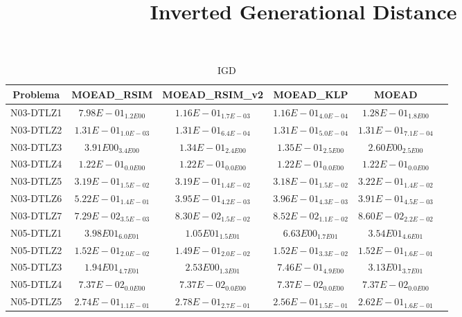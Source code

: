 \documentclass{article}
\title{Inverted Generational Distance}
\author{}
\begin{document}
\maketitle
\begin{table*}[ht!]
\scriptsize
\caption{IGD}
\centering\begin{tabular}{|c||c||c||c||c||c|} \hline
Problema &MOEAD_RSIM &MOEAD_RSIM_v2 &MOEAD_KLP &MOEAD\\\hline
N03-DTLZ1 &$7.98E-01_{1.2E00}$ &\cellcolor{gray25}$1.16E-01_{1.7E-03}$ &\cellcolor{gray95}$1.16E-01_{4.0E-04}$ &$1.28E-01_{1.8E00}$\\ 
\hline
N03-DTLZ2 &$1.31E-01_{1.0E-03}$ &\cellcolor{gray25}$1.31E-01_{6.4E-04}$ &\cellcolor{gray95}$1.31E-01_{5.0E-04}$ &$1.31E-01_{7.1E-04}$\\ 
\hline
N03-DTLZ3 &$3.91E00_{3.4E00}$ &\cellcolor{gray95}$1.34E-01_{2.4E00}$ &\cellcolor{gray25}$1.35E-01_{2.5E00}$ &$2.60E00_{2.5E00}$\\ 
\hline
N03-DTLZ4 &\cellcolor{gray95}$1.22E-01_{0.0E00}$ &\cellcolor{gray25}$1.22E-01_{0.0E00}$ &$1.22E-01_{0.0E00}$ &$1.22E-01_{0.0E00}$\\ 
\hline
N03-DTLZ5 &\cellcolor{gray25}$3.19E-01_{1.5E-02}$ &$3.19E-01_{1.4E-02}$ &\cellcolor{gray95}$3.18E-01_{1.5E-02}$ &$3.22E-01_{1.4E-02}$\\ 
\hline
N03-DTLZ6 &$5.22E-01_{1.4E-01}$ &\cellcolor{gray25}$3.95E-01_{4.2E-03}$ &$3.96E-01_{4.3E-03}$ &\cellcolor{gray95}$3.91E-01_{4.5E-03}$\\ 
\hline
N03-DTLZ7 &\cellcolor{gray95}$7.29E-02_{3.5E-03}$ &\cellcolor{gray25}$8.30E-02_{1.5E-02}$ &$8.52E-02_{1.1E-02}$ &$8.60E-02_{2.2E-02}$\\ 
\hline
N05-DTLZ1 &$3.98E01_{6.0E01}$ &\cellcolor{gray25}$1.05E01_{1.5E01}$ &\cellcolor{gray95}$6.63E00_{1.7E01}$ &$3.54E01_{4.6E01}$\\ 
\hline
N05-DTLZ2 &\cellcolor{gray25}$1.52E-01_{2.0E-02}$ &\cellcolor{gray95}$1.49E-01_{2.0E-02}$ &$1.52E-01_{3.3E-02}$ &$1.52E-01_{1.6E-01}$\\ 
\hline
N05-DTLZ3 &$1.94E01_{4.7E01}$ &\cellcolor{gray25}$2.53E00_{1.3E01}$ &\cellcolor{gray95}$7.46E-01_{4.9E00}$ &$3.13E01_{3.7E01}$\\ 
\hline
N05-DTLZ4 &\cellcolor{gray95}$7.37E-02_{0.0E00}$ &\cellcolor{gray25}$7.37E-02_{0.0E00}$ &$7.37E-02_{0.0E00}$ &$7.37E-02_{0.0E00}$\\ 
\hline
N05-DTLZ5 &$2.74E-01_{1.1E-01}$ &$2.78E-01_{2.7E-01}$ &\cellcolor{gray95}$2.56E-01_{1.5E-01}$ &\cellcolor{gray25}$2.62E-01_{1.6E-01}$\\ 

\end{tabular}
\end{table*}
\end{document}
